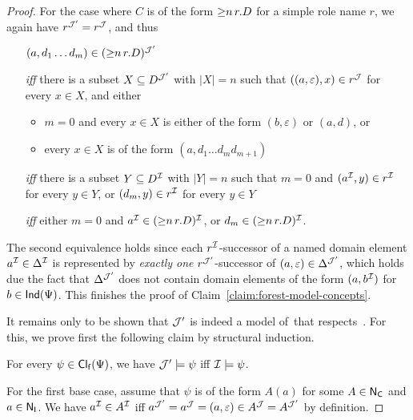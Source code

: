 \begin{proof}
    \noindent
    For the case where $C$ is of the form ${\ge}n\,r.D$ for a simple role
    name $r$, we again have $r^{\mathcal{J}'}=r^\mathcal{J}$, and thus
    \begin{itemize}
        \item[]
            $(a,d_1\dots d_m)\in({\ge}n\,r.D)^{\mathcal{J}'}$
        \item[\emph{iff}]
            there is a subset $X\subseteq D^{\mathcal{J}'}$ with $\lvert X\rvert=n$
            such that $((a,\varepsilon),x)\in r^\mathcal{J}$ for every $x\in X$, and
            either
            \begin{itemize}
                \item $m=0$ and every $x\in X$ is either of the form
                    $(b,\varepsilon)$ or $(a,d)$, or
                \item every $x\in X$ is of the form $(a,d_1\dots d_m d_{m+1})$
            \end{itemize}
        \item[\emph{iff}]
            there is a subset $Y\subseteq D^\mathcal{I}$ with $\lvert Y\rvert=n$ such
            that $m=0$ and $(a^\mathcal{I},y)\in r^\mathcal{I}$ for every $y\in Y$, or
            $(d_m,y)\in r^\mathcal{I}$ for every $y\in Y$
        \item[\emph{iff}]
            either $m=0$ and $a^\mathcal{I}\in({\ge}n\,r.D)^\mathcal{I}$, or
            $d_m\in({\ge}n\,r.D)^\mathcal{I}$.
    \end{itemize}
    The second equivalence holds since each $r^\mathcal{I}$-successor of a named
    domain element $a^\mathcal{I}\in\Delta^\mathcal{I}$ is represented by \emph{exactly one}
    $r^{\mathcal{J}'}$-successor of $(a,\varepsilon)\in\Delta^{\mathcal{J}'}$, which holds due
    the fact that $\Delta^{\mathcal{J}'}$ does not contain domain elements of the form
    $(a,b^\mathcal{I})$ for $b\in\mathsf{Ind}(\Psi)$.
    This finishes the proof of Claim~\ref{claim:forest-model-concepts}.

    It remains only to be shown that $\mathcal{J}'$ is indeed a model of~\Bmc that
    respects~\Dmc.  For this, we prove first the following claim by structural
    induction.

    \begin{claim}\label{claim:forest-model-fcl}
        For every $\psi\in\operatorname{\mathsf{Cl_f}}(\Psi)$, we have $\mathcal{J}'\models\psi$ iff
        $\mathcal{I}\models\psi$.
    \end{claim}

    \noindent
    For the first base case, assume that $\psi$ is of the form $A(a)$ for some
    $A\in\mathsf{N_C}$ and $a\in\mathsf{N_I}$.  We have $a^\mathcal{I}\in A^\mathcal{I}$ iff
    $a^{\mathcal{J}'}=a^\mathcal{J}=(a,\varepsilon)\in A^\mathcal{J}=A^{\mathcal{J}'}$ by definition.


\end{proof}
